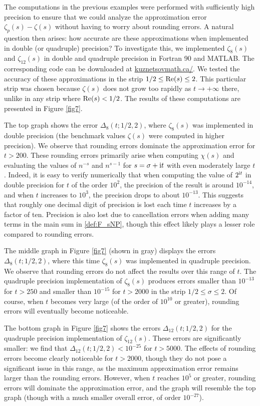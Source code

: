 \documentclass[12pt]{article}
\def\re{\textnormal {Re}}
\def\i{{\textnormal i}}
\theoremstyle{definition}
\begin{document}
The computations in the previous examples were performed with sufficiently high precision to ensure that we could analyze the approximation error $\zeta_p(s)-\zeta(s)$ without having to worry about rounding errors. A natural question then arises: how accurate are these approximations when implemented in double (or quadruple) precision? To investigate this, we implemented $\zeta_8(s)$ and $\zeta_{12}(s)$ in double and quadruple precision in Fortran 90 and MATLAB. The corresponding code can be downloaded at \href{https://kuznetsovmath.ca/}{kuznetsovmath.ca/}. We tested the accuracy of these approximations in the strip $1/2\le \re(s) \le 2$. This particular strip was chosen because $\zeta(s)$ does not grow too rapidly as $t \to +\infty$ there, unlike in any strip where $\re(s)<1/2$. The results of these computations are presented in Figure \ref{fig7}. 

The top graph shows the error $\Delta_8(t;1/2,2)$, where $\zeta_8(s)$ was implemented in double precision (the benchmark values $\zeta(s)$ were computed in higher precision). We observe that rounding errors dominate the approximation error for $t>200$. These rounding errors primarily arise when computing $\chi(s)$ and evaluating the values of $n^{-s}$ and $n^{s-1}$ for $s=\sigma+\i t$ with even moderately large $t$. Indeed, it is easy to verify numerically that when computing the value of $2^{\i t}$ in double precision for $t$ of the order $10^2$, the precision of the result is around $10^{-14}$, and when $t$ increases to $10^3$, the precision drops to about $10^{-13}$. This suggests that roughly one decimal digit of precision is lost each time 
$t$ increases by a factor of ten. Precision is also lost due to cancellation errors when adding many terms in the main sum in \eqref{def:F_sNP}, though this effect likely plays a lesser role compared to rounding errors.   

The middle graph in Figure \ref{fig7} (shown in gray) displays  the errors $\Delta_8(t;1/2,2)$, where this time  $\zeta_8(s)$ was implemented in quadruple precision. We observe that rounding errors do not affect the results over this range of $t$. The quadruple precision implementation of $\zeta_8(s)$ produces errors smaller than $10^{-13}$ for $t>250$ and smaller than $10^{-15}$ for $t>2000$ in the strip $1/2 \le \sigma \le 2$. Of course, when $t$ becomes very large (of the order of $10^{10}$ or greater), rounding errors will eventually become noticeable. 

The bottom graph in Figure \ref{fig7} shows the errors 
$\Delta_{12}(t;1/2,2)$ for the quadruple precision implementation of $\zeta_{12}(s)$. These errors are significantly smaller: we find that  $\Delta_{12}(t;1/2,2)< 10^{-25}$ for $t>5000$. The effects of rounding errors become clearly noticeable for $t>2000$, though they do not pose a significant issue in this range, as the maximum approximation error remains larger than the rounding errors.  However, when $t$ reaches $10^{5}$ or greater, rounding errors will dominate the approximation error, and the graph will resemble the top graph (though with a much smaller overall error, of order $10^{-27}$). 
\end{document}
